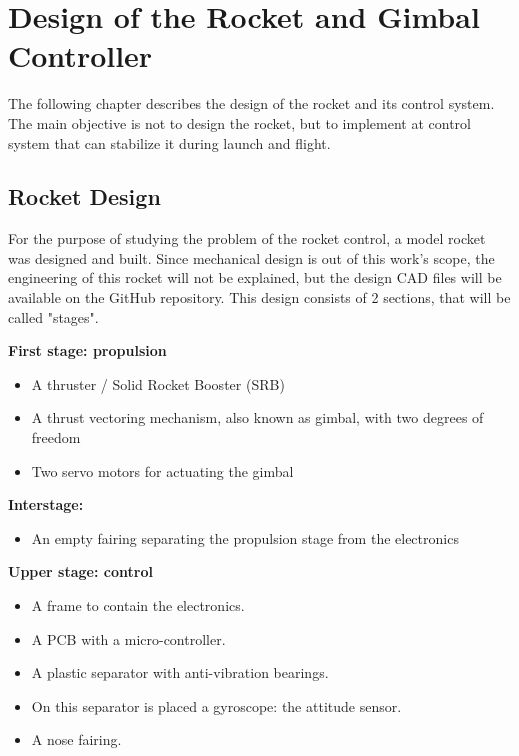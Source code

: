 
\chapter{Design of the Rocket and Gimbal Controller}
The following chapter describes the design of the rocket and its control system. The main objective is not to design the rocket, but to implement at control system that can stabilize it during launch and flight. 

\section{Rocket Design}
For the purpose of studying the problem of the rocket control, a model rocket was designed and built. Since mechanical design is out of this work's scope, the engineering of this rocket will not be explained, but the design CAD files will be available on the GitHub repository.
This design consists of 2 sections, that will be called "stages".


\textbf{First stage: propulsion}
\begin{itemize}[noitemsep]
	\item {A thruster / Solid Rocket Booster (SRB)}
	\item {A thrust vectoring mechanism, also known as gimbal, with two degrees of freedom}
	\item {Two servo motors for actuating the gimbal}
\end{itemize}

\textbf{Interstage:}
\begin{itemize}[noitemsep]
	\item {An empty fairing separating the propulsion stage from the electronics}
\end{itemize}
\textbf{Upper stage: control}
\begin{itemize}[noitemsep]
	\item A frame to contain the electronics.
	\item A PCB with a micro-controller.
	\item A plastic separator with anti-vibration bearings.
	\item On this separator is placed a gyroscope: the attitude sensor.
	\item A nose fairing.
\end{itemize}

